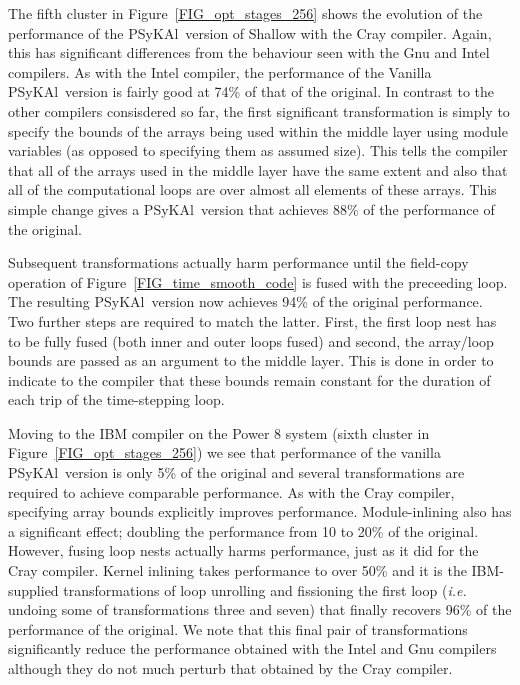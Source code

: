 \documentclass{IOS-Book-Article}
\newcommand{\psykal}{{PS}y{KA}l}
\begin{document}
The fifth cluster in Figure~\ref{FIG_opt_stages_256} shows the
evolution of the performance of the \psykal\ version of Shallow with
the Cray compiler. Again, this has significant differences from the
behaviour seen with the Gnu and Intel compilers. As with the Intel
compiler, the performance of the Vanilla \psykal\ version is fairly
good at 74\% of that of the original. In contrast to the other
compilers consisdered so far, the first significant transformation is
simply to specify the bounds of the arrays being used within the
middle layer using module variables (as opposed to specifying them as
assumed size). This tells the compiler that all of the arrays used in
the middle layer have the same extent and also that all of the
computational loops are over almost all elements of these arrays. This
simple change gives a \psykal\ version that achieves 88\% of the
performance of the original.

Subsequent transformations actually harm performance until the
field-copy operation of Figure~\ref{FIG_time_smooth_code} is fused
with the preceeding loop. The resulting \psykal\ version now achieves
94\% of the original performance. Two further steps are required to
match the latter. First, the first loop nest has to be fully fused
(both inner and outer loops fused) and second, the array/loop bounds
are passed as an argument to the middle layer. This is done in order
to indicate to the compiler that these bounds remain constant for the
duration of each trip of the time-stepping loop.

Moving to the IBM compiler on the Power 8 system (sixth cluster in
Figure~\ref{FIG_opt_stages_256}) we see that performance of the
vanilla \psykal\ version is only 5\% of the original and several
transformations are required to achieve comparable performance. As
with the Cray compiler, specifying array bounds explicitly improves
performance. Module-inlining also has a significant effect; doubling
the performance from 10 to 20\% of the original. However, fusing loop
nests actually harms performance, just as it did for the Cray
compiler. Kernel inlining takes performance to over 50\% and it is the
IBM-supplied transformations of loop unrolling and fissioning the
first loop ({\it i.e.} undoing some of transformations three and
seven) that finally recovers 96\% of the performance of the
original. We note that this final pair of transformations significantly
reduce the performance obtained with the Intel and Gnu compilers
although they do not much perturb that obtained by the Cray
compiler.
\end{document}
